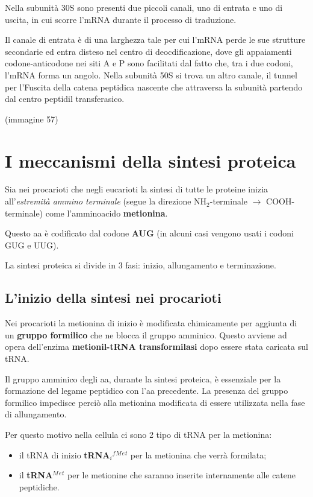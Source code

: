 \documentclass[11pt]{book}
\begin{document}
Nella subunità 30S sono presenti due piccoli canali, uno di entrata e
uno di uscita, in cui scorre l'mRNA durante il processo di traduzione.

Il canale di entrata è di una larghezza tale per cui l'mRNA perde le sue
strutture secondarie ed entra disteso nel centro di deocdificazione,
dove gli appaiamenti codone-anticodone nei siti A e P sono facilitati
dal fatto che, tra i due codoni, l'mRNA forma un angolo. Nella subunità
50S si trova un altro canale, il tunnel per l'Fuscita della catena
peptidica nascente che attraversa la subunità partendo dal centro
peptidil transferasico.

(immagine 57)

\section{I meccanismi della sintesi
proteica}\label{i-meccanismi-della-sintesi-proteica}

Sia nei procarioti che negli eucarioti la sintesi di tutte le proteine
inizia all'\emph{estremità ammino terminale} (segue la direzione
NH\(_2\)-terminale \(\rightarrow\) COOH-terminale) come l'amminoacido
\textbf{metionina}.

Questo aa è codificato dal codone \textbf{AUG} (in alcuni casi vengono
usati i codoni GUG e UUG).

La sintesi proteica si divide in 3 fasi: inizio, allungamento e
terminazione.

\subsection{L'inizio della sintesi nei
procarioti}\label{linizio-della-sintesi-nei-procarioti}

Nei procarioti la metionina di inizio è modificata chimicamente per
aggiunta di un \textbf{gruppo formilico} che ne blocca il gruppo
amminico. Questo avviene ad opera dell'enzima \textbf{metionil-tRNA
transformilasi} dopo essere stata caricata sul tRNA.

Il gruppo amminico degli aa, durante la sintesi proteica, è essenziale
per la formazione del legame peptidico con l'aa precedente. La presenza
del gruppo formilico impedisce perciò alla metionina modificata di
essere utilizzata nella fase di allungamento.

Per questo motivo nella cellula ci sono 2 tipo di tRNA per la metionina:

\begin{itemize}
\itemsep1pt\parskip0pt
\item
  il tRNA di inizio \textbf{tRNA\(_i\)\(^f\)\(^M\)\(^e\)\(^t\)} per la
  metionina che verrà formilata;
\item
  il \textbf{tRNA\(^M\)\(^e\)\(^t\)} per le metionine che saranno
  inserite internamente alle catene peptidiche.
\end{itemize}
\end{document}
